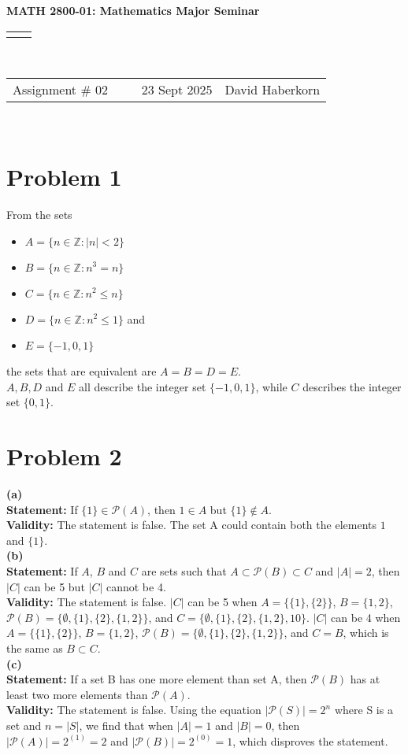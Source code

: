 \documentclass[11pt]{article}
\renewcommand{\title}[1]{\textbf{#1}\\}
\renewcommand{\line}{\begin{tabularx}{\textwidth}{X>{\raggedleft}X}\hline\\\end{tabularx}\\[-0.5cm]}
\newcommand{\leftright}[2]{\begin{tabularx}{\textwidth}{X>{\raggedleft}X}#1%
& #2\\\end{tabularx}\\[-0.5cm]}
\begin{document}
\title{MATH 2800-01: Mathematics Major Seminar}
\line
\leftright{Assignment \# 02 ~~~~ 23 Sept 2025}{David Haberkorn}


\section*{Problem 1}

From the sets 
\begin{itemize}
    \item $A = \{n \in \mathbb{Z} : |n| < 2\}$
    \item $B = \{n \in \mathbb{Z} : n^3 = n\}$
    \item $C = \{n \in \mathbb{Z} : n^2 \leq n\}$
    \item $D = \{n \in \mathbb{Z} : n^2 \leq 1\}$ and 
    \item $E = \{-1, 0, 1\}$
\end{itemize}
the sets that are equivalent are $ A = B = D = E $. \\
$A, B, D$ and $E$ all describe the integer set $\{-1, 0, 1\}$, while $C$ describes the integer set $\{0, 1\}$.


\newpage


\section*{Problem 2}

\textbf{(a)} \\
    \textbf{ Statement:} If $ \{1\} \in \mathcal{P}(A)$, then $ 1 \in A $ but $ \{1\} \notin A $. \\
    \textbf{Validity:} The statement is false. The set A could contain both the elements $ 1 $ and $ \{1\} $. \\
\textbf{(b)} \\
    \textbf{Statement:} If $A$, $B$ and $C$ are sets such that $ A \subset    \mathcal{P}(B) \subset C $ and $ |A| = 2 $, then $ |C| $ can be 5 but $|C|$ cannot be 4. \\
    \textbf{Validity:} The statement is false. $ |C| $ can be 5 when $ A = \{\{1\}, \{2\}\}$, $ B = \{1,2\}$, $ \mathcal{P}(B) = \{ \emptyset, \{1\}, \{2\}, \{1,2\} \}$, and $ C = \{ \emptyset, \{1\}, \{2\}, \{1,2\}, 10\}.$ $ |C| $ can be 4 when $ A = \{\{1\}, \{2\}\}$, $ B = \{1,2\}$, $ \mathcal{P}(B) = \{ \emptyset, \{1\}, \{2\}, \{1,2\} \}$, and $ C = B $, which is the same as $ B \subset C$. \\
\textbf{(c)} \\
    \textbf{Statement:} If a set B has one more element than set A, then $ \mathcal{P}(B) $ has at least two more elements than $ \mathcal{P}(A)$.\\
    \textbf{Validity:} The statement is false. Using the equation $ |\mathcal{P}(S)| = 2^n$ where S is a set and $ n = |S| $, we find that when $|A| = 1$ and $|B| = 0$, then $|\mathcal{P}(A)| = 2^{(1)} = 2$ and $|\mathcal{P}(B)| = 2^{(0)} = 1$, which disproves the statement.
\end{document}
